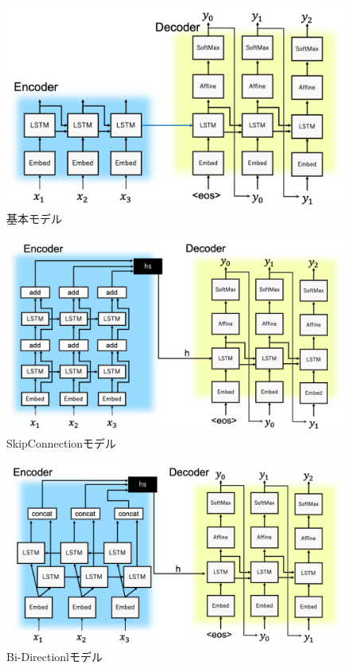 \documentclass[a4j,11pt,report]{jsbook}
\begin{document}
\begin{center}
  \begin{figure}[H]
    \centering
    \includegraphics[width=0.9\linewidth]{image/seq2seq_image.png}
    \caption{基本モデル}
    \label{fig:seq2seq}
  \end{figure}
\end{center}

\begin{center}
  \begin{figure}[H]
    \centering
    \includegraphics[width=0.9\linewidth]{image/Skipconnect.png}
    \caption{SkipConnectionモデル}
    \label{fig:SkipSeq2seq}
  \end{figure}
\end{center}

\begin{center}
  \begin{figure}[H]
    \centering
    \includegraphics[width=0.9\linewidth]{image/twinRNN.png}
    \caption{Bi-Directionlモデル}
    \label{fig:bi-directional Seq2seq}
  \end{figure}
\end{center}
\end{document}
